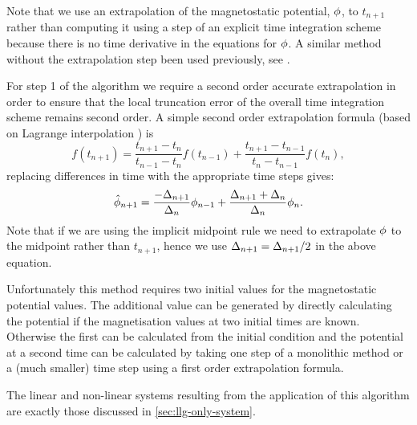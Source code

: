 Note that we use an extrapolation of the magnetostatic potential, $\phi$, to $t_{n+1}$ rather than computing it using a step of an explicit time integration scheme because there is no time derivative in the equations for $\phi$.
A similar method without the extrapolation step been used previously, see \eg \cite{Schrefl1997}.


For step 1 of the algorithm we require a second order accurate extrapolation in order to ensure that the local truncation error of the overall time integration scheme remains second order.
A simple second order extrapolation formula (based on Lagrange interpolation \cite[312]{Kincaid2002}) is
\begin{equation}
  \label{eq:65}
  f(t_{n+1}) = \frac{t_{n+1} - t_n}{t_{n-1} - t_n}f(t_{n-1}) + \frac{t_{n+1} - t_{n-1}}{t_n - t_{n-1}}f(t_n),
\end{equation}
replacing differences in time with the appropriate time steps gives:
\begin{equation}
  \label{eq:66}
  \hat{\phi}_{n+1} = \frac{-\Delta_{n+1}}{\Delta_{n}} \phi_{n-1} + \frac{\Delta_{n+1} + \Delta_{n}}{\Delta_{n}} \phi_n.
\end{equation}
Note that if we are using the implicit midpoint rule we need to extrapolate $\phi$ to the midpoint rather than $t_{n+1}$, hence we use $\Delta_{n+1} = \Delta_{n+1} /2$ in the above equation.


Unfortunately this method requires two initial values for the magnetostatic potential values.
The additional value can be generated by directly calculating the potential if the magnetisation values at two initial times are known.
Otherwise the first can be calculated from the initial condition and the potential at a second time can be calculated by taking one step of a monolithic method or a (much smaller) time step using a first order extrapolation formula.

The linear and non-linear systems resulting from the application of this algorithm are exactly those discussed in \cref{sec:llg-only-system}.




